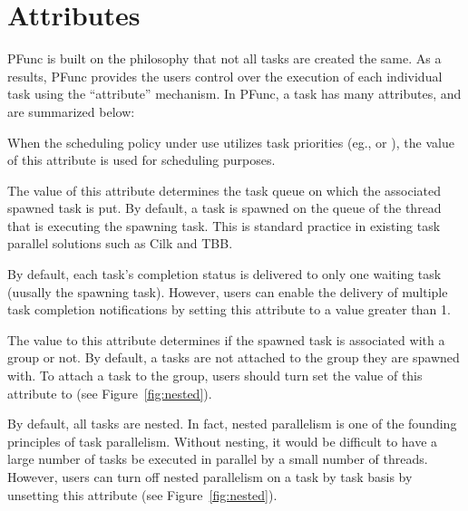 \section{Attributes}
\label{sec:attribute}

PFunc is built on the philosophy that not all tasks are created the same. As 
a results, PFunc provides the users control over the execution of each 
individual task using the ``attribute'' mechanism. In PFunc, a task has 
many attributes, and are summarized below:

\begin{list}{}{\leftmargin=1em}
\item {} When the scheduling policy under use utilizes task
priorities (eg.,  or ), the value of this attribute is
used for scheduling purposes.
\item {} The value of this attribute determines the task
queue on which the associated spawned task is put. By default, a task is
spawned on the queue of the thread that is executing the spawning task. This 
is standard practice in existing task parallel solutions such as Cilk and TBB.
\item {} By default, each task's completion status is 
delivered to only one waiting task (uusally the spawning task). However, users 
can enable the delivery of multiple task completion notifications by setting 
this attribute to a value greater than 1. 
\item {} The value to this attribute determines if the spawned
task is associated with a group or not. By default, a tasks are not attached to
the group they are spawned with. To attach a task to the group, users should 
turn set the value of this attribute to  (see
Figure~\ref{fig:nested}).
\item {} By default, all tasks are nested. In fact, nested 
parallelism is one of the founding principles of task parallelism. Without
nesting, it would be difficult to have a large number of tasks be executed 
in parallel by a small number of threads. However, users can turn off nested
parallelism on a task by task basis by unsetting this attribute (see
Figure~\ref{fig:nested}).
\end{list}

